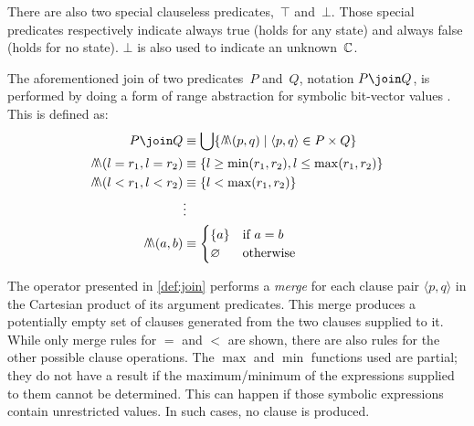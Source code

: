 There are also two special clauseless predicates,~$\top$%
and~$\bot$.
Those special predicates respectively indicate always true (holds for any state) and always false (holds for no state).
$\bot$ is also used to indicate an unknown~$\mathbb C$.%
\begin{definition}\label{def:join}
  The aforementioned join
  of two predicates~$P$ and~$Q$,%
  notation $P\join Q$,
  is performed by doing a form of range abstraction for symbolic bit-vector values \autocite{rugina2000symbolic}.
  This is defined as:
  \begin{align*} %
    P\join Q &\equiv \bigcup\{\merge(p,q) \mid \langle p,q\rangle\in P\times Q\} \\
    \merge(l=r_1,l=r_2) &\equiv \{l\ge\min(r_1,r_2),l\le\max(r_1,r_2)\} \\
    \merge(l<r_1,l<r_2) &\equiv \{l<\max(r_1,r_2)\} \\
    &\vdots\\
    \merge(a,b) &\equiv
    \begin{cases}
      \{a\} & \text{if }a=b \\
      \varnothing & \text{otherwise}
    \end{cases}
  \end{align*}
\end{definition}
The operator presented in \cref{def:join}
performs a \emph{merge} for each clause pair
$\langle p,q\rangle$
in the Cartesian product %
of its argument predicates.
This merge produces a potentially empty set of clauses
generated from the two clauses supplied to it.
While only merge rules for $=$ and $<$ are shown, there are also rules
for the other possible clause operations.
The $\max$ and $\min$ functions used are partial;%
%
%
they do not have a result if the maximum/minimum of the expressions supplied to them cannot be determined.%
This can happen if those symbolic expressions
contain unrestricted values.
In such cases, no clause is produced.

